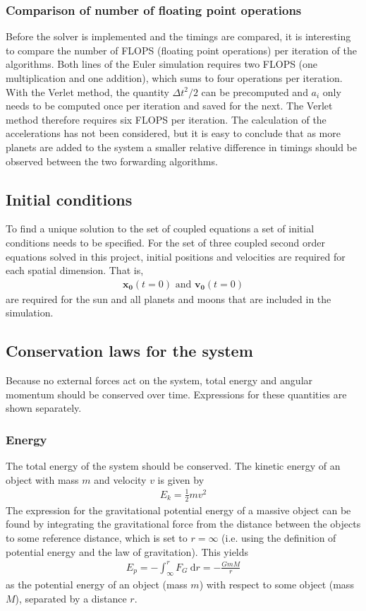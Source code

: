 \documentclass[aps,reprint]{revtex4-1}
\begin{document}
\subsubsection{Comparison of number of floating point operations}
Before the solver is implemented and the timings are compared, it is interesting
to compare the number of FLOPS (floating point operations) per iteration of the
algorithms. Both lines of the Euler simulation requires two FLOPS (one
multiplication and one addition), which sums to four operations per iteration.
With the Verlet method, the quantity $\Delta{t}^2 / 2$ can be precomputed and
$a_{i}$ only needs to be computed once per iteration and saved for the next.
The Verlet method therefore requires six FLOPS per iteration. The calculation
of the accelerations has not been considered, but it is easy to conclude that
as more planets are added to the system a smaller relative difference in timings
should be observed between the two forwarding algorithms.
\subsection{Initial conditions}
To find a unique solution to the set of coupled equations a set of initial conditions needs
to be specified. For the set of three coupled second order equations solved in this project,
initial positions and velocities are required for each spatial dimension. That is,
\begin{align*}
 \mathbf{x_0}(t = 0) \text{ and } \mathbf{v_0}(t = 0)
\end{align*}
are required for the sun and all planets and moons that are included in the simulation.

\subsection{Conservation laws for the system}
Because no external forces act on the system, total energy and angular momentum should
be conserved over time. Expressions for these quantities are shown separately.
\subsubsection{Energy}
The total energy of the system should be conserved. The kinetic energy of an object with
mass $m$ and velocity $v$ is given by
\begin{align*}
 E_k = \frac{1}{2}m v^2
\end{align*}
The expression for the gravitational potential energy of a massive object can be found by
integrating the gravitational force from the distance between the objects to some reference
distance, which is set to $r = \infty$ (i.e. using the definition of potential energy and the law
of gravitation). This yields
\begin{align*}
  \label{eq:potentialenergy}
 E_p = -\int_\infty^r F_G\: \text{d} r = -\frac{GmM}{r}
\end{align*}
as the potential energy of an object (mass $m$) with respect to some object (mass $M$),
separated by a distance $r$.
\end{document}
